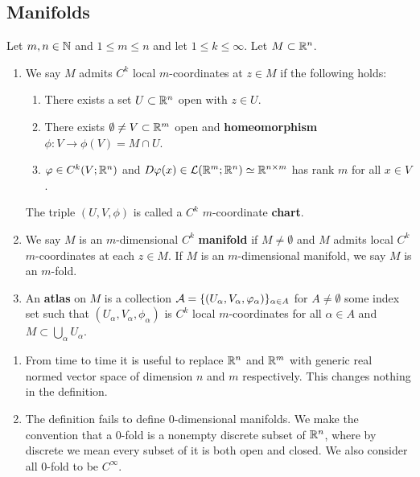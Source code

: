 \documentclass[a4paper]{article}
\begin{document}
\subsection{Manifolds}

\begin{defi}
Let $m, n \in \mathbb{N}$ and $1 \leq m \leq n$ and let 
$1 \leq k \leq \infty$. Let $M \subset \mathbb{R}^n$.
\begin{enumerate}
\item We say $M$ admits $C^k$ local $m$-coordinates 
at $z \in M$ if the following holds: 
\begin{enumerate}
  \item There exists a set $U \subset \mathbb{R}^n$ open with 
  $z \in U$.

  \item There exists $\emptyset \neq V \subset \mathbb{R}^m$ open 
  and \textbf{homeomorphism} $\phi : V \to \phi(V) = M 
  \cap U$. 

  \item $\varphi \in C^k(V ; \mathbb{R}^n)$ and $D \varphi(x) \in \mathcal{L}(\mathbb{R}^m; 
  \mathbb{R}^n) \simeq \mathbb{R}^{n \times m}$ has rank $m$ for all 
  $x \in V$.
\end{enumerate}
The triple $(U, V, \phi)$ is called a $C^k$ $m$-coordinate 
\textbf{chart}.

\item We say $M$ is an $m$-dimensional $C^k$ \textbf{manifold}
if $M \neq \emptyset$ and $M$ admits local $C^k$ $m$-coordinates
at each $z \in M$. If $M$ is an $m$-dimensional manifold, 
we say $M$ is an $m$-fold.

\item An \textbf{atlas} on $M$ is a collection 
$\mathcal{A} = \{(U_\alpha, V_\alpha, \varphi_\alpha)\}_{\alpha \in A}$
for $A \neq \emptyset$ some index set such that 
$(U_\alpha, V_\alpha, \phi_\alpha)$ is $C^k$ local $m$-coordinates 
for all $\alpha \in A$ and $M \subset 
\bigcup_\alpha U_\alpha$.
\end{enumerate}
\end{defi}

\begin{remark}
\begin{enumerate}
\item From time to time it is useful to replace $\mathbb{R}^n$
and $\mathbb{R}^m$ with generic real normed vector space of 
dimension $n$ and $m$ respectively. This changes nothing 
in the definition.

\item The definition fails to define $0$-dimensional 
manifolds. We make the convention that a $0$-fold is a 
nonempty discrete subset of $\mathbb{R}^n$, where by discrete we mean 
every subset of it is both open and closed. We also consider 
all $0$-fold to be $C^\infty$.
\end{enumerate}
\end{remark}
\end{document}
